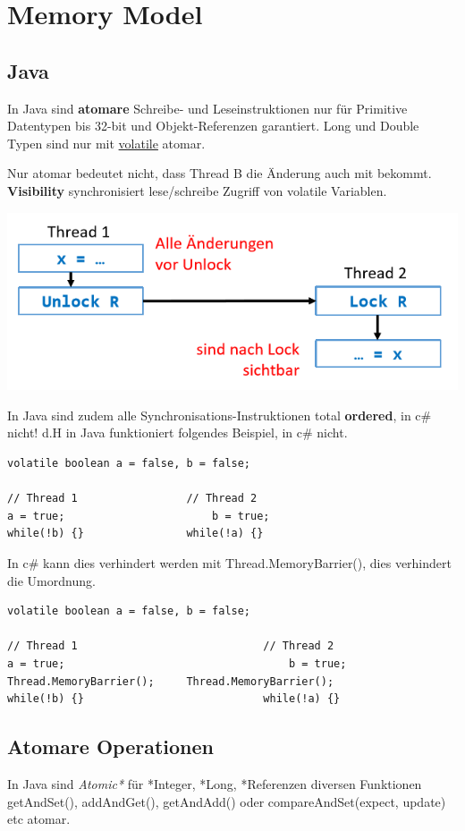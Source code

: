\section{Memory Model}
\subsection{Java}
In Java sind \textbf{atomare} Schreibe- und Leseinstruktionen nur für Primitive Datentypen bis 32-bit und Objekt-Referenzen garantiert. Long und Double Typen sind nur mit \underline{volatile} atomar.

Nur atomar bedeutet nicht, dass Thread B die Änderung auch mit bekommt. \textbf{Visibility} synchronisiert lese/schreibe Zugriff von volatile Variablen.

\begin{center}
	\includegraphics[width=0.6\columnwidth]{Images/visibility}
\end{center}

In Java sind zudem alle Synchronisations-Instruktionen total \textbf{ordered}, in c\# nicht! d.H in Java funktioniert folgendes Beispiel, in c\# nicht.
\begin{lstlisting}
volatile boolean a = false, b = false;

// Thread 1					// Thread 2
a = true;						b = true;
while(!b) {}				while(!a) {}
\end{lstlisting}

In c\# kann dies verhindert werden mit Thread.MemoryBarrier(), dies verhindert die Umordnung.
\begin{lstlisting}
volatile boolean a = false, b = false;

// Thread 1								// Thread 2
a = true;									b = true;
Thread.MemoryBarrier();		Thread.MemoryBarrier();
while(!b) {}							while(!a) {}
\end{lstlisting}


\subsection{Atomare Operationen}
In Java sind \textit{Atomic*} für *Integer, *Long, *Referenzen diversen Funktionen getAndSet(), addAndGet(), getAndAdd() oder compareAndSet(expect, update) etc atomar.

